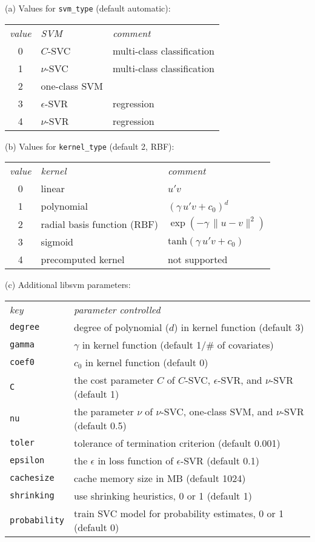 \documentclass{article}
\begin{document}
\begin{table}[p]
  (a) Values for \texttt{svm\_type} (default automatic):
  \begin{center}
  \begin{tabular}{cll}
\textit{value} & \textit{SVM} & \textit{comment} \\[2pt]
0 & $C$-SVC & multi-class classification \\
1 & $\nu$-SVC & multi-class classification \\
2 & one-class SVM & \\
3 & $\epsilon$-SVR & regression \\
4 & $\nu$-SVR & regression   
  \end{tabular}
  \end{center}

  (b) Values for \texttt{kernel\_type} (default 2, RBF):
  \begin{center}
  \begin{tabular}{cll}
\textit{value} & \textit{kernel} & \textit{comment} \\[2pt]
0 & linear & $u'v$ \\
1 & polynomial & $(\gamma\, u'v + c_0)^d$ \\
2 & radial basis function (RBF) & $\exp(-\gamma\, \lVert u-v \rVert^2)$ \\
3 & sigmoid & $\mbox{tanh}(\gamma\, u'v + c_0)$ \\
4 & precomputed kernel & not supported
  \end{tabular}
  \end{center}

  (c) Additional \textsf{libsvm} parameters:
  \begin{center}
  \begin{tabular}{ll}
    \textit{key} & \textit{parameter controlled} \\[2pt]
\texttt{degree} & degree of polynomial ($d$) in kernel function (default 3) \\
\texttt{gamma} & $\gamma$ in kernel function (default 1/\# of covariates) \\
\texttt{coef0} & $c_0$ in kernel function (default 0) \\
\texttt{C} & the cost parameter $C$ of $C$-SVC, $\epsilon$-SVR, and $\nu$-SVR (default 1) \\
\texttt{nu} & the parameter $\nu$ of $\nu$-SVC, one-class SVM, and $\nu$-SVR (default
     0.5) \\
\texttt{toler} & tolerance of termination criterion (default 0.001) \\
\texttt{epsilon} & the $\epsilon$ in loss function of $\epsilon$-SVR (default 0.1) \\
\texttt{cachesize} & cache memory size in MB (default 1024) \\
\texttt{shrinking} & use shrinking heuristics, 0 or 1 (default 1) \\
\texttt{probability} & train SVC model for probability estimates, 0 or 1 (default 0)
  \end{tabular}
  \end{center}


\end{table}
\end{document}
